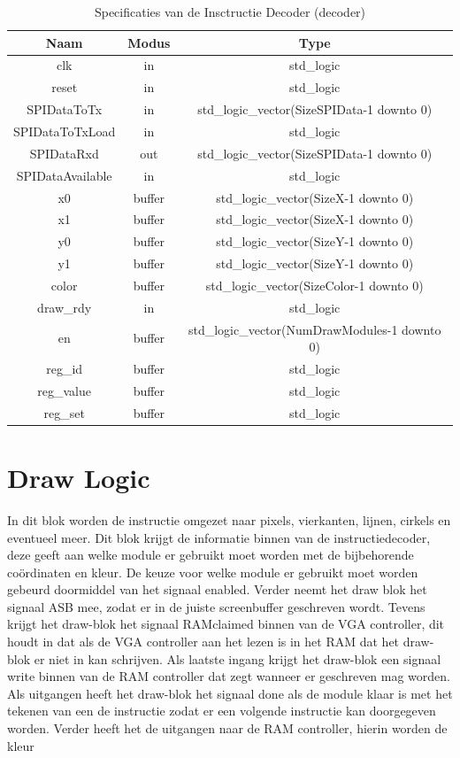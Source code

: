 \documentclass{scrreprt} %
\begin{document}
\begin{table}[H]
\centering
\caption{Specificaties van de Insctructie Decoder (decoder)}
\label{tab:spec-decoder}
\begin{tabular}{c c c}
	\hline\hline
 	Naam & Modus & Type\\
 	\hline
	clk & in & std\_logic \\
	reset & in & std\_logic \\	
	SPIDataToTx & in & std\_logic\_vector(SizeSPIData-1 downto 0) \\
	SPIDataToTxLoad & in & std\_logic \\
	SPIDataRxd & out & std\_logic\_vector(SizeSPIData-1 downto 0) \\
	SPIDataAvailable & in & std\_logic \\
	x0 &  buffer & std\_logic\_vector(SizeX-1 downto 0) \\
	x1 &  buffer & std\_logic\_vector(SizeX-1 downto 0) \\
	y0 &  buffer & std\_logic\_vector(SizeY-1 downto 0) \\
	y1 &  buffer & std\_logic\_vector(SizeY-1 downto 0) \\
	color &  buffer & std\_logic\_vector(SizeColor-1 downto 0) \\
	draw\_rdy & in & std\_logic \\
	en & buffer & std\_logic\_vector(NumDrawModules-1 downto 0)\\
	reg\_id & buffer & std\_logic \\
	reg\_value & buffer & std\_logic \\
	reg\_set & buffer & std\_logic \\
  	\hline
\end{tabular}
\end{table}

\section{Draw Logic}
In dit blok worden de instructie omgezet naar pixels, vierkanten, lijnen, cirkels en eventueel meer. Dit blok krijgt de informatie binnen van de instructiedecoder, deze geeft aan welke module er gebruikt moet worden met de bijbehorende coördinaten en kleur.
De keuze voor welke module er gebruikt moet worden gebeurd doormiddel van het signaal enabled. Verder neemt het draw blok het signaal ASB mee, zodat er in de juiste screenbuffer geschreven wordt.
Tevens krijgt het draw-blok het signaal RAMclaimed binnen van de VGA controller, dit houdt in dat als de VGA controller aan het lezen is in het RAM dat het draw-blok er niet in kan schrijven.
Als laatste ingang krijgt het draw-blok een signaal write binnen van de RAM controller dat zegt wanneer er geschreven mag worden.
Als uitgangen heeft het draw-blok het signaal done als de module klaar is met het tekenen van een de instructie zodat er een volgende instructie kan doorgegeven worden. Verder heeft het de uitgangen naar de RAM controller, hierin worden de kleur 
\end{document}
